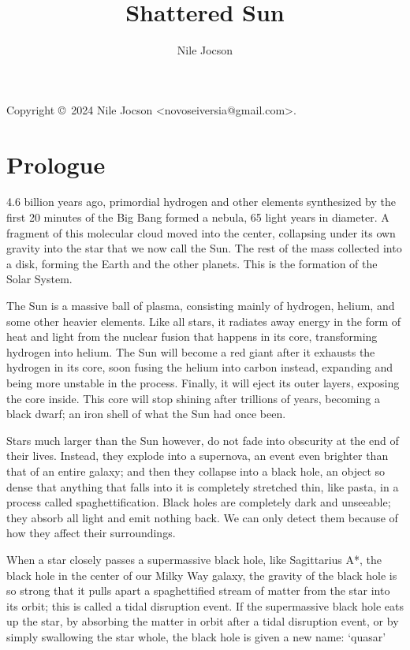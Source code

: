 \documentclass{book}
\title{Shattered Sun}
\author{Nile Jocson}
\begin{document}
	\frontmatter{}
		\maketitle{}

		Copyright \copyright{}~2024 Nile Jocson \textless{}novoseiversia@gmail.com\textgreater{}.



	\mainmatter{}
		\chapter*{Prologue}
			4.6 billion years ago, primordial hydrogen and other elements synthesized by the first
			20 minutes of the Big Bang formed a nebula, 65 light years in diameter. A fragment of
			this molecular cloud moved into the center, collapsing under its own gravity into the
			star that we now call the Sun. The rest of the mass collected into a disk, forming the
			Earth and the other planets. This is the formation of the Solar System.

			The Sun is a massive ball of plasma, consisting mainly of hydrogen, helium, and some
			other heavier elements. Like all stars, it radiates away energy in the form of heat and
			light from the nuclear fusion that happens in its core, transforming hydrogen into
			helium. The Sun will become a red giant after it exhausts the hydrogen in its core,
			soon fusing the helium into carbon instead, expanding and being more unstable in the
			process. Finally, it will eject its outer layers, exposing the core inside. This core
			will stop shining after trillions of years, becoming a black dwarf; an iron shell of
			what the Sun had once been.

			Stars much larger than the Sun however, do not fade into obscurity at the end of their
			lives. Instead, they explode into a supernova, an event even brighter than that of an
			entire galaxy; and then they collapse into a black hole, an object so dense that
			anything that falls into it is completely stretched thin, like pasta, in a process
			called spaghettification. Black holes are completely dark and unseeable; they absorb
			all light and emit nothing back. We can only detect them because of how they affect
			their surroundings.

			When a star closely passes a supermassive black hole, like Sagittarius A*, the black
			hole in the center of our Milky Way galaxy, the gravity of the black hole is so strong
			that it pulls apart a spaghettified stream of matter from the star into its orbit; this
			is called a tidal disruption event. If the supermassive black hole eats up the star, by
			absorbing the matter in orbit after a tidal disruption event, or by simply swallowing
			the star whole, the black hole is given a new name: `quasar'
\end{document}
